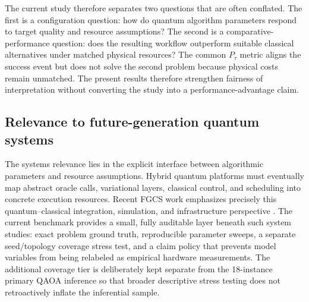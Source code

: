 \documentclass[5p,times]{elsarticle}
\begin{document}
The current study therefore separates two questions that are often conflated. The first is a configuration question: how do quantum algorithm parameters respond to target quality and resource assumptions? The second is a comparative-performance question: does the resulting workflow outperform suitable classical alternatives under matched physical resources? The common $P_{\tau}$ metric aligns the success event but does not solve the second problem because physical costs remain unmatched. The present results therefore strengthen fairness of interpretation without converting the study into a performance-advantage claim.

\subsection{Relevance to future-generation quantum systems}
The systems relevance lies in the explicit interface between algorithmic parameters and resource assumptions. Hybrid quantum platforms must eventually map abstract oracle calls, variational layers, classical control, and scheduling into concrete execution resources. Recent FGCS work emphasizes precisely this quantum--classical integration, simulation, and infrastructure perspective \cite{markidis2026editorial,netzer2026,vallero2026}. The current benchmark provides a small, fully auditable layer beneath such system studies: exact problem ground truth, reproducible parameter sweeps, a separate seed/topology coverage stress test, and a claim policy that prevents model variables from being relabeled as empirical hardware measurements. The additional coverage tier is deliberately kept separate from the 18-instance primary QAOA inference so that broader descriptive stress testing does not retroactively inflate the inferential sample.
\end{document}
